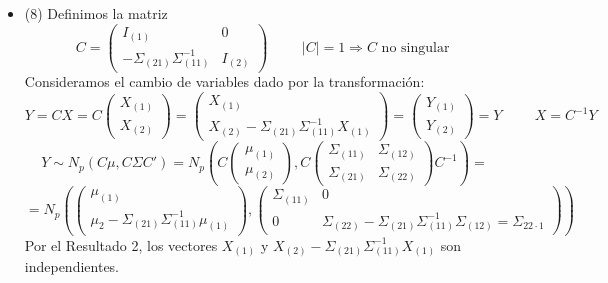 \documentclass[11pt,a4paper]{article}
\begin{document}
\begin{itemize}
\begin{itemize}
\item (8) Definimos la matriz
$$C = \begin{pmatrix}
I_{(1)} & 0 \\
-\Sigma_{(21)}\Sigma_{(11)}^{-1} & I_{(2)}
\end{pmatrix} \hspace{1cm} |C| = 1 \Rightarrow C \text{ no singular }$$
Consideramos el cambio de variables dado por la transformación:
$$Y = CX = C \begin{pmatrix} X_{(1)} \\ X_{(2)} \end{pmatrix} = \begin{pmatrix}
X_{(1)} \\
X_{(2)} - \Sigma_{(21)}\Sigma_{(11)}^{-1}X_{(1)}
\end{pmatrix} = \begin{pmatrix} Y_{(1)} \\ Y_{(2)} \end{pmatrix} = Y \hspace{1cm} X = C^{-1}Y$$
$$Y \sim N_{p}(C \mu, C \Sigma C') = N_{p}(C \begin{pmatrix} \mu_{(1)} \\ \mu_{(2)} \end{pmatrix}, C \begin{pmatrix} \Sigma_{(11)} & \Sigma_{(12)} \\ \Sigma_{(21)} & \Sigma_{(22)} \end{pmatrix} C^{-1}) =$$
$$= N_{p} (\begin{pmatrix} \mu_{(1)} \\ \mu_{2} - \Sigma_{(21)}\Sigma_{(11)}^{-1}\mu_{(1)} \end{pmatrix}, \begin{pmatrix}
\Sigma_{(11)} & 0 \\
0 & \Sigma_{(22)} - \Sigma_{(21)}\Sigma_{(11)}^{-1}\Sigma_{(12)} = \Sigma_{22 \cdot 1}
\end{pmatrix})$$
Por el Resultado 2, los vectores $X_{(1)}$ y $X_{(2)} - \Sigma_{(21)}\Sigma_{(11)}^{-1}X_{(1)}$ son independientes.


\end{itemize}
\end{itemize}
\end{document}

